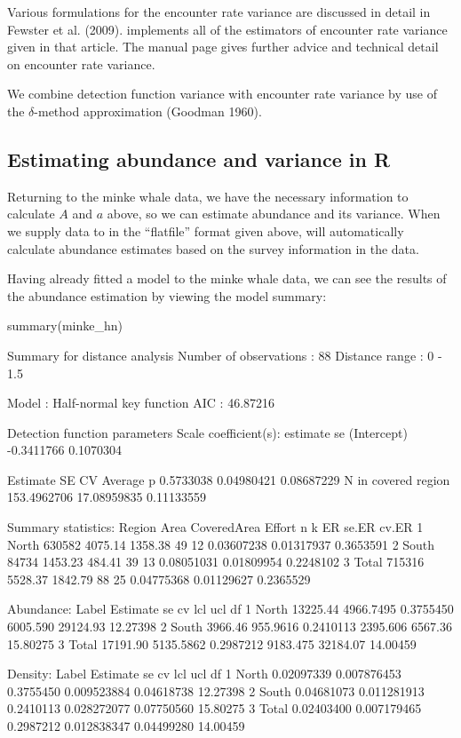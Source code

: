 \documentclass[article]{jss}
\begin{document}
Various formulations for the encounter rate variance are discussed in
detail in Fewster et al. (2009).  implements all of the
estimators of encounter rate variance given in that article. The
 manual page gives further advice and technical detail on
encounter rate variance.

We combine detection function variance with encounter rate variance by
use of the \(\delta\)-method approximation (Goodman 1960).

\subsection{Estimating abundance and variance in
R}\label{estimating-abundance-and-variance-in-r}

Returning to the minke whale data, we have the necessary information to
calculate \(A\) and \(a\) above, so we can estimate abundance and its
variance. When we supply data to  in the ``flatfile'' format
given above,  will automatically calculate abundance estimates
based on the survey information in the data.

Having already fitted a model to the minke whale data, we can see the
results of the abundance estimation by viewing the model summary:

\begin{CodeChunk}
\begin{CodeInput}
summary(minke_hn)
\end{CodeInput}
\begin{CodeOutput}

Summary for distance analysis 
Number of observations :  88 
Distance range         :  0  -  1.5 

Model : Half-normal key function 
AIC   : 46.87216 

Detection function parameters
Scale coefficient(s):  
              estimate        se
(Intercept) -0.3411766 0.1070304

                       Estimate          SE         CV
Average p             0.5733038  0.04980421 0.08687229
N in covered region 153.4962706 17.08959835 0.11133559

Summary statistics:
  Region   Area CoveredArea  Effort  n  k         ER      se.ER     cv.ER
1  North 630582     4075.14 1358.38 49 12 0.03607238 0.01317937 0.3653591
2  South  84734     1453.23  484.41 39 13 0.08051031 0.01809954 0.2248102
3  Total 715316     5528.37 1842.79 88 25 0.04775368 0.01129627 0.2365529

Abundance:
  Label Estimate        se        cv      lcl      ucl       df
1 North 13225.44 4966.7495 0.3755450 6005.590 29124.93 12.27398
2 South  3966.46  955.9616 0.2410113 2395.606  6567.36 15.80275
3 Total 17191.90 5135.5862 0.2987212 9183.475 32184.07 14.00459

Density:
  Label   Estimate          se        cv         lcl        ucl       df
1 North 0.02097339 0.007876453 0.3755450 0.009523884 0.04618738 12.27398
2 South 0.04681073 0.011281913 0.2410113 0.028272077 0.07750560 15.80275
3 Total 0.02403400 0.007179465 0.2987212 0.012838347 0.04499280 14.00459
\end{CodeOutput}
\end{CodeChunk}
\end{document}

